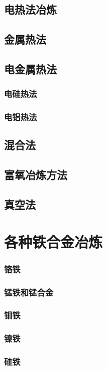 \documentclass[UTF8]{../../ApplicationUniverse}
\begin{document}
    \subsection{电热法冶炼}
    \subsection{金属热法}
    \subsection{电金属热法}
        \subsubsection{电硅热法}
        \subsubsection{电铝热法}
    \subsection{混合法}
    \subsection{富氧冶炼方法}
    \subsection{真空法}
\section{各种铁合金冶炼}
    \subsubsection{铬铁}
    \subsubsection{锰铁和锰合金}
    \subsubsection{钼铁}
    \subsubsection{镍铁}
    \subsubsection{硅铁}
\end{document}

